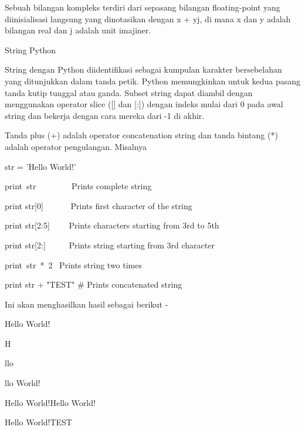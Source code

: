 Sebuah bilangan kompleks terdiri dari sepasang bilangan floating-point yang diinisialisasi langsung yang dinotasikan dengan x + yj, di mana x dan y adalah bilangan real dan j adalah unit imajiner. \par
\vspace{12pt}
\noindent 
String Python \par
\vspace{12pt}
\noindent 
String dengan Python diidentifikasi sebagai kumpulan karakter bersebelahan yang ditunjukkan dalam tanda petik. $  $Python memungkinkan untuk kedua pasang tanda kutip tunggal atau ganda. $  $Subset string dapat diambil dengan menggunakan operator slice ([] dan [:]) dengan indeks mulai dari 0 pada awal string dan bekerja dengan cara mereka dari -1 di akhir. \par
\vspace{12pt}
\noindent 
Tanda plus (+) adalah operator concatenation string dan tanda bintang (*) adalah operator pengulangan. $  $Misalnya  \par
\vspace{12pt}
\vspace{12pt}
\noindent 
str = 'Hello World!' \par
\vspace{12pt}
\noindent 
print~str~~~~~~~~  Prints complete string \par
\noindent 
print str[0]~~~~~~  Prints first character of the string \par
\noindent 
print str[2:5]~~~~  Prints characters starting from 3rd to 5th \par
\noindent 
print str[2:]~~~~~  Prints string starting from 3rd character \par
\noindent 
print~str~*~2~     Prints string two times \par
\noindent 
print str + "TEST"  $  \#  $ Prints concatenated string \par
\vspace{12pt}
\noindent 
Ini akan menghasilkan hasil sebagai berikut - \par
\vspace{12pt}
\noindent 
Hello World! \par
\noindent 
H \par
\noindent 
llo \par
\noindent 
llo World! \par
\noindent 
Hello World!Hello World! \par
\noindent 
Hello World!TEST \par
\vspace{12pt}
